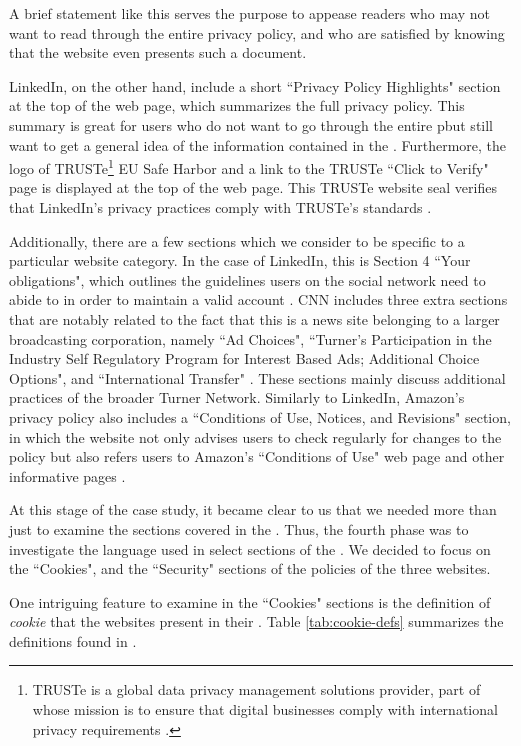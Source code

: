 \documentclass{acm_proc_article-sp}
\begin{document}
A brief statement like this serves the purpose to appease readers who may not want to read through the entire privacy policy, and who are satisfied by knowing that the website even presents such a document.

LinkedIn, on the other hand, include a short ``Privacy Policy Highlights" section at the top of the web page, which summarizes the full privacy policy. This summary is great for users who do not want to go through the entire p\pp but still want to get a general idea of the information contained in the \pp. Furthermore, the logo of TRUSTe\footnote{TRUSTe is a global data privacy management solutions provider, part of whose mission is to ensure that digital businesses comply with international privacy requirements \cite{truste}.} EU Safe Harbor and a link to the TRUSTe ``Click to Verify" page is displayed at the top of the \pp web page. This TRUSTe website seal verifies that LinkedIn's privacy practices comply with TRUSTe's standards \cite{truste}.

Additionally, there are a few sections which we consider to be specific to a particular website category. In the case of LinkedIn, this is Section 4 ``Your obligations", which outlines the guidelines users on the social network need to abide to in order to maintain a valid account \cite{linkedin}. CNN includes three extra sections that are notably related to the fact that this is a news site belonging to a larger broadcasting corporation, namely ``Ad Choices", ``Turner's Participation in the Industry Self Regulatory Program for Interest Based Ads; Additional Choice Options", and ``International Transfer" \cite{cnn}. These sections mainly discuss additional practices of the broader Turner Network. Similarly to LinkedIn, Amazon's privacy policy also includes a ``Conditions of Use, Notices, and Revisions" section, in which the website not only advises users to check regularly for changes to the policy but also refers users to Amazon's ``Conditions of Use" web page and other informative pages \cite{amazon}.

At this stage of the case study, it became clear to us that we needed more than just to examine the sections covered in the \pps. Thus, the fourth phase was to investigate the language used in select sections of the \pps. We decided to focus on the ``Cookies", and the ``Security" sections of the policies of the three websites.

One intriguing feature to examine in the ``Cookies" sections is the definition of \textit{cookie} that the websites present in their \pps. Table \ref{tab:cookie-defs} summarizes the definitions found in \cite{amazon,linkedin,cnn}.
\end{document}
